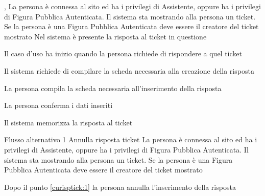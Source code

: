 
{, }
{La persona è connessa al sito ed ha i privilegi di Assistente, oppure ha i privilegi di Figura Pubblica Autenticata. Il sistema sta mostrando alla persona un ticket. Se la persona è una Figura Pubblica Autenticata deve essere il creatore del ticket mostrato}
{Nel sistema è presente la risposta al ticket in questione}
{\begin{enumCU}
	\item Il caso d'uso ha inizio quando la persona richiede di rispondere a quel ticket
	\item Il sistema richiede di compilare la scheda necessaria alla creazione della risposta
	\item La persona compila la scheda necessaria all'inserimento della risposta\label{curisptick:1}
	\item La persona conferma i dati inseriti
	\item Il sistema memorizza la risposta al ticket
\end{enumCU}}
%
{Flusso alternativo 1}%
{Annulla risposta ticket}%
{La persona è connessa al sito ed ha i privilegi di Assistente, oppure ha i privilegi di Figura Pubblica Autenticata. Il sistema sta mostrando alla persona un ticket. Se la persona è una Figura Pubblica Autenticata deve essere il creatore del ticket mostrato}%
{\postNulle}%
{\begin{enumCU}
		\item Dopo il punto \ref{curisptick:1} la persona annulla l'inserimento della risposta
	\end{enumCU}}%


